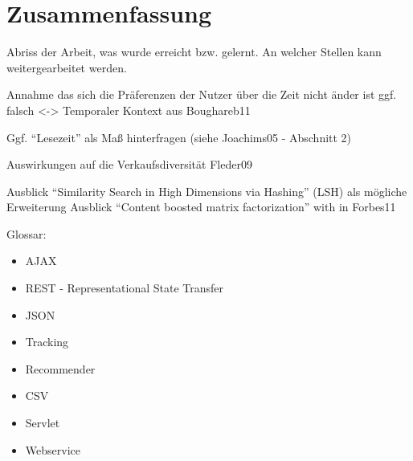 
\section{Zusammenfassung}

	Abriss der Arbeit, was wurde erreicht bzw. gelernt. An welcher Stellen kann weitergearbeitet werden. 


Annahme das sich die Präferenzen der Nutzer über die Zeit nicht änder ist ggf. falsch <-> Temporaler Kontext aus Boughareb11 

Ggf. ``Lesezeit'' als Maß hinterfragen (siehe Joachims05 - Abschnitt 2)

Auswirkungen auf die Verkaufsdiversität Fleder09

Ausblick ``Similarity Search in High Dimensions via Hashing'' (LSH) als mögliche Erweiterung
Ausblick ``Content boosted matrix factorization'' with in Forbes11



Glossar:
\begin{itemize}
\item AJAX
\item REST - Representational State Transfer
\item JSON
\item Tracking
\item Recommender
\item CSV
\item Servlet
\item Webservice
\end{itemize}